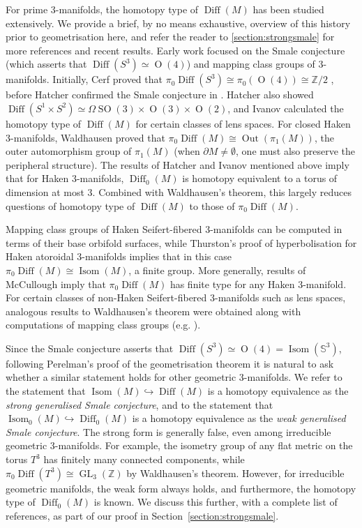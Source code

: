 \documentclass{amsart}
\theoremstyle{plain}
\theoremstyle{definition}
\DeclareMathOperator\Diff{Diff}
\DeclareMathOperator\Isom{Isom}
\DeclareMathOperator\SO{SO}
\DeclareMathOperator\Or{O}
\DeclareMathOperator\GL{GL}
\DeclareMathOperator{\Out}{Out}
\newcommand{\bbS}{\mathbb{S}}
\newcommand{\Z}{\mathbb{Z}}
\begin{document}
For prime 3-manifolds, the homotopy type of $\Diff(M)$ has been studied extensively.  We provide a brief, by no means exhaustive, overview of this history prior to geometrisation here, and refer the reader to \cref{section:strongsmale} for more references and recent results. Early work focused on the Smale conjecture (which asserts that $\Diff(S^3)\simeq \Or(4)$) and mapping class groups of 3-manifolds. Initially, Cerf proved that $\pi_0\Diff(S^3)\cong \pi_0(\Or(4))\cong \Z/2$ \cite{Cerf},  before Hatcher confirmed the Smale conjecture in \cite{Hatcher}. Hatcher \cite{Hatcher1981} also  showed $\Diff(S^1\times S^2)\simeq \Omega \SO(3)\times \Or(3)\times \Or(2)$, and Ivanov \cite{Ivanov79,Ivanov82} calculated the homotopy type of $\Diff(M)$ for certain classes of lens spaces. For closed Haken 3-manifolds, Waldhausen \cite{Waldhausen68} proved that $\pi_0\Diff(M)\cong \Out(\pi_1(M))$, the outer automorphism group of $\pi_1(M)$ (when $\partial M\neq \emptyset$, one must also preserve the peripheral structure). The results of Hatcher \cite{Hatcher76} and Ivanov \cite{Ivanov76} mentioned above imply that for Haken 3-manifolds, $\Diff_0(M)$ is homotopy equivalent to a torus of dimension at most 3.  Combined with Waldhausen's theorem, this largely reduces questions of homotopy type of $\Diff(M)$ to those of $\pi_0\Diff(M)$.

Mapping class groups of Haken Seifert-fibered 3-manifolds can be computed in terms of their base orbifold surfaces, while Thurston's proof  of hyperbolisation  for Haken atoroidal 3-manifolds \cite{ThurstonAtoroidal} implies that in this case $\pi_0\Diff(M)\cong \Isom(M)$, a finite group. More generally, results of McCullough \cite{McCullough1991} imply that $\pi_0\Diff(M)$ has finite type for any Haken 3-manifold. For certain classes of non-Haken Seifert-fibered 3-manifolds such as lens spaces, analogous results to Waldhausen's theorem were obtained along with computations of mapping class groups (e.g. \cite{Asano1978,Rubinstein1979,Bonahon1983,BirmanRubinstein1984,Scott85, BoileauOtal1986}). 


Since the Smale conjecture asserts that $\Diff(S^3)\simeq \Or(4)=\Isom(\bbS^3)$, following Perelman's proof of the geometrisation theorem \cite{Perelman:2002-1,Perelman:2003-1,Perelman:2003-2} it is natural to ask whether a similar statement holds for other geometric 3-manifolds.  
We refer to the statement that $\Isom(M)\hookrightarrow \Diff(M)$ is a homotopy equivalence as the \emph{strong generalised Smale conjecture}, and to the statement that $\Isom_0(M)\hookrightarrow \Diff_0(M)$ is a homotopy equivalence as the \emph{weak generalised Smale conjecture}.
The strong form is generally false, even among irreducible geometric 3-manifolds.
For example, the isometry group of any flat metric on the torus $T^3$ has finitely many connected components, while $\pi_0\Diff(T^3)\cong \GL_3(\Z)$ by Waldhausen's theorem. However, for irreducible geometric manifolds, the weak form always holds, and furthermore, the homotopy type of $\Diff_0(M)$ is known. We discuss this further, with a complete list of references, as part of our proof in Section~\ref{section:strongsmale}. 
\end{document}
